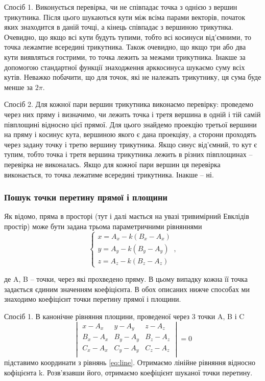\documentclass[a4paper,12pt]{article}
\begin{document}
Спосіб 1. Виконується перевірка, чи не співпадає точка з однією з вершин трикутника. Після цього шукаються кути між всіма парами векторів, початок яких знаходится в даній точці, а кінець співпадає з вершиною трикутнка. Очевидно, що якщо всі кути будуть тупими, тобто всі косинуси від’ємними, то точка лежамтие всередині трикутника. Також очевидно, що якщо три або два кути виявляться гострими, то точка лежить за межами трикутника. Інакше за допомогою стандартної функції знаходження арккосинуса шукаємо суму всіх кутів. Неважко побачити, що для точок, які не належать трикутнику, ця сума буде менше за $2\pi$.

Спосіб 2. Для кожної пари вершин трикутника виконаємо перевірку: проведемо через них пряму і визначимо, чи лежить точка і третя вершина в одній і тій самій півплощині відносно цієї прямої. Для цього знайдемо проекцію третьої вершини на пряму і косинус кута, вершиною якого є дана проекціяу, а сторони проходять через задану точку і третю вершину трикутника. Якщо синус від’ємний, то кут є тупим, тобто точка і третя вершина трикутника лежить в різних півплощинах -- перевірка не виконалась. Якщо для кожної пари вершин ця перевірка виконається, то точка лежатиме всередині трикутника. Інакше -- ні.

\subsubsection{Пошук точки перетину прямої і площини}
Як відомо, пряма в просторі (тут і далі мається на увазі тривимірний Евклідів простір) може бути задана трьома параметричними рівняннями
\begin{equation} \label{eq:line}
  \begin{cases}
    x = A_x - k(B_x - A_x) \\
    y = A_y - k(B_y - A_y) \\
    z = A_z - k(B_z - A_z)
  \end{cases},
\end{equation}

де A, B -- точки, через які прохведено пряму. В цьому випадку кожна її точка задається єдиним значенням коефіцієнта. В обох описаних нижче способах ми знаходимо коефіцієнт точки перетину прямої і площини.

Спосіб 1. 
В канонічне рівняння площини, проведеної через 3 точки A, B і C
\begin{equation} \label{eq:plane}
  \begin{vmatrix}
    x - A_x & y - A_y & z - A_z \\
    B_x - A_x & B_y - A_y & B_z - A_z \\
    C_x - A_x & C_y - A_y & C_z - A_z \\
  \end{vmatrix} = 0
\end{equation}
підставимо координати з рівнянь \ref{eq:line}. Отримаємо лінійне рівняння відносно кофіцієнта k. Розв’язавши його, отримаємо коефіцієнт шуканої точки перетину.
\end{document}
